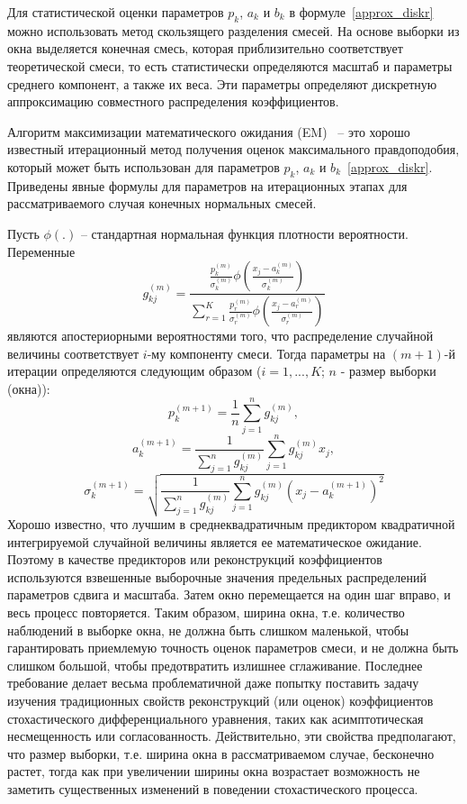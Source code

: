 Для статистической оценки параметров $p_k$, $a_k$ и $b_k$ в формуле~\eqref{approx_diskr} можно использовать метод скользящего разделения смесей. На основе выборки из окна выделяется конечная смесь, которая приблизительно соответствует теоретической смеси, то есть статистически определяются масштаб и параметры среднего компонент, а также их веса. Эти параметры определяют дискретную аппроксимацию совместного распределения коэффициентов.

Алгоритм максимизации математического ожидания (EM)~\cite{McLachlan2007} -- это хорошо известный итерационный метод получения оценок максимального правдоподобия, который может быть использован для параметров $p_k$, $a_k$ и $b_k$~\eqref{approx_diskr}. Приведены явные формулы для параметров на итерационных этапах для рассматриваемого случая конечных нормальных смесей. 

Пусть $\phi(.)$ -- стандартная нормальная функция плотности вероятности. Переменные 
$$
g_{kj}^{(m)}= \frac{\frac{p_k^{(m)}}{\sigma_k^{(m)}} \phi\left(\frac{x_j - a_k^{(m)}}{\sigma_k^{(m)}} \right)}{\sum\limits_{r=1}^K \frac{p_r^{(m)}}{\sigma_r^{(m)}} \phi\left(\frac{x_j - a_r^{(m)}}{\sigma_r^{(m)}} \right)}
$$
являются апостериорными вероятностями того, что распределение случайной величины соответствует $i$-му компоненту смеси. Тогда параметры на $(m+1)$-й итерации определяются следующим образом ($i=1,...,K$; $n$ - размер выборки (окна)):
$$
p_k^{(m+1)} = \frac{1}{n} \sum\limits_{j=1}^n g_{kj}^{(m)},
$$
$$
a_k^{(m+1)} = \frac{1}{\sum\limits_{j=1}^n g_{kj}^{(m)}} \sum\limits_{j=1}^n g_{kj}^{(m)} x_j,
$$
$$
\sigma_k^{(m+1)} = \sqrt{\frac{1}{\sum\limits_{j=1}^n g_{kj}^{(m)}} \sum\limits_{j=1}^n g_{kj}^{(m)} (x_j - a_k^{(m+1)})^2}
$$
Хорошо известно, что лучшим в среднеквадратичным предиктором квадратичной интегрируемой случайной величины является ее математическое ожидание. Поэтому в качестве предикторов или реконструкций коэффициентов используются взвешенные выборочные значения предельных распределений параметров сдвига и масштаба. Затем окно перемещается на один шаг вправо, и весь процесс повторяется. Таким образом, ширина окна, т.е. количество наблюдений в выборке окна, не должна быть слишком маленькой, чтобы гарантировать приемлемую точность оценок параметров смеси, и не должна быть слишком большой, чтобы предотвратить излишнее сглаживание. Последнее требование делает весьма проблематичной даже попытку поставить задачу изучения традиционных свойств реконструкций (или оценок) коэффициентов стохастического дифференциального уравнения, таких как асимптотическая несмещенность или согласованность. Действительно, эти свойства предполагают, что размер выборки, т.е. ширина окна в рассматриваемом случае, бесконечно растет, тогда как при увеличении ширины окна возрастает возможность не заметить существенных изменений в поведении стохастического процесса.

